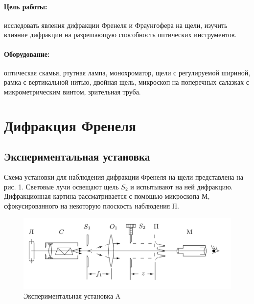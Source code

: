 






	\paragraph{Цель работы:} исследовать явления дифракции Френеля и Фраунгофера на щели, изучить влияние дифракции на разрешающую способность оптических инструментов.
	
	\paragraph{Оборудование:} оптическая скамья, ртутная лампа, монохроматор, щели с регулируемой шириной, рамка с вертикальной
нитью, двойная щель, микроскоп на поперечных салазках с микрометрическим винтом, зрительная труба.

	\section{Дифракция Френеля}
	
	\subsection{Экспериментальная установка}
	
	Схема установки для наблюдения дифракции Френеля на щели
представлена на рис. 1. Световые лучи освещают щель $ S_2 $ и испытывают на ней дифракцию. Дифракционная картина рассматривается с помощью микроскопа М, сфокусированного на некоторую плоскость наблюдения П.
	
	\begin{figure}[h!]
		\centering
		\includegraphics[width=0.8\linewidth]{pics/a.png}
		\caption{Экспериментальная установка A}
		\label{labA}
	\end{figure}

